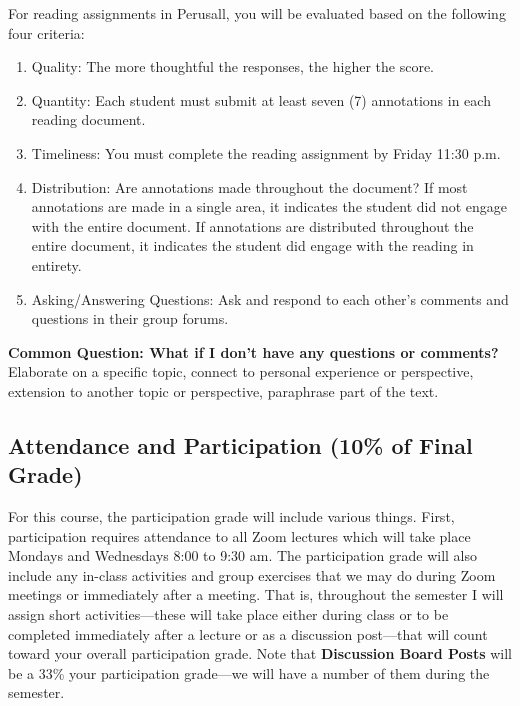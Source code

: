 \documentclass[11pt,]{article}
\providecommand{\tightlist}{%
  \setlength{\itemsep}{0pt}\setlength{\parskip}{0pt}}
\begin{document}
For reading assignments in Perusall, you will be evaluated based on the
following four criteria:

\begin{enumerate}
\def\labelenumi{\arabic{enumi}.}
\tightlist
\item
  Quality: The more thoughtful the responses, the higher the score.
\item
  Quantity: Each student must submit at least seven (7) annotations in
  each reading document.
\item
  Timeliness: You must complete the reading assignment by Friday 11:30
  p.m.
\item
  Distribution: Are annotations made throughout the document? If most
  annotations are made in a single area, it indicates the student did
  not engage with the entire document. If annotations are distributed
  throughout the entire document, it indicates the student did engage
  with the reading in entirety.
\item
  Asking/Answering Questions: Ask and respond to each other's comments
  and questions in their group forums.
\end{enumerate}

\textbf{Common Question: What if I don't have any questions or
comments?} Elaborate on a specific topic, connect to personal experience
or perspective, extension to another topic or perspective, paraphrase
part of the text.

\hypertarget{attendance-and-participation-10-of-final-grade}{%
\subsection{Attendance and Participation (10\% of Final
Grade)}\label{attendance-and-participation-10-of-final-grade}}

For this course, the participation grade will include various things.
First, participation requires attendance to all Zoom lectures which will
take place Mondays and Wednesdays 8:00 to 9:30 am. The participation
grade will also include any in-class activities and group exercises that
we may do during Zoom meetings or immediately after a meeting. That is,
throughout the semester I will assign short activities---these will take
place either during class or to be completed immediately after a lecture
or as a discussion post---that will count toward your overall
participation grade. Note that \textbf{Discussion Board Posts} will be a
33\% your participation grade---we will have a number of them during the
semester.
\end{document}
